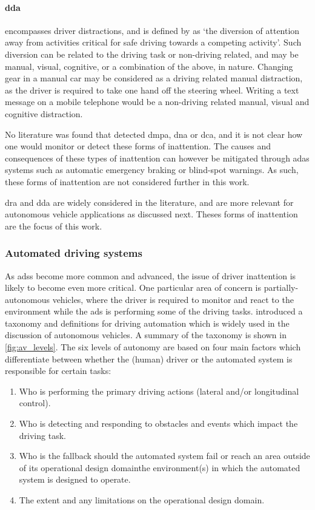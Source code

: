 \documentclass[11pt, parskip=half*,twoside=false]{scrbook}
\begin{document}
\paragraph{\gls{dda}} encompasses driver distractions, and is defined by \citet{reganDriverDistractionDriver2011} as `the diversion of attention away from activities critical for safe driving towards a competing activity'. Such diversion can be related to the driving task or non-driving related, and may be manual, visual, cognitive, or a combination of the above, in nature. Changing gear in a manual car may be considered as a driving related manual distraction, as the driver is required to take one hand off the steering wheel. Writing a text message on a mobile telephone would be a non-driving related manual, visual and cognitive distraction. 

No literature was found that detected \gls{dmpa}, \gls{dna} or \gls{dca}, and it is not clear how one would monitor or detect these forms of inattention. The causes and consequences of these types of inattention can however be mitigated through \gls{adas} systems such as automatic emergency braking or blind-spot warnings. As such, these forms of inattention are not considered further in this work.

\gls{dra} and \gls{dda} are widely considered in the literature, and are more relevant for autonomous vehicle applications as discussed next. Theses forms of inattention are the focus of this work.

\subsubsection{Automated driving systems}
As \glspl{ads} become more common and advanced, the issue of driver inattention is likely to become even more critical. One particular area of concern is partially-autonomous vehicles, where the driver is required to monitor and react to the environment while the \gls{ads} is performing some of the driving tasks.  \citet{J3016_201806} introduced a taxonomy and definitions for driving automation which is widely used in the discussion of autonomous vehicles. A summary of the taxonomy is shown in \cref{fig:av_levels}. The six levels of autonomy are based on four main factors which differentiate between whether the (human) driver or the automated system is responsible for certain tasks: 

\begin{enumerate}
	\item Who is performing the primary driving actions (lateral and/or longitudinal control).
	\item Who is detecting and responding to obstacles and events which impact the driving task.
	\item Who is the fallback should the automated system fail or reach an area outside of its operational design domain\textemdash the environment(s) in which the automated system is designed to operate.
	\item The extent and any limitations on the operational design domain.
\end{enumerate}
\end{document}
